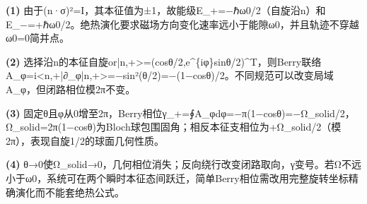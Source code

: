 \par\noindent\textbf{(1)} 由于(n·σ)²=I，其本征值为±1，故能级E\_+=−ℏω0/2（自旋沿n）和E\_−=+ℏω0/2。绝热演化要求磁场方向变化速率远小于能隙ω0，并且轨迹不穿越ω0=0简并点。
\par\noindent\textbf{(2)} 选择沿n的本征自旋or|n,+>=(cosθ/2,e\textasciicircum{}\{iφ\}sinθ/2)\textasciicircum{}T，则Berry联络A\_φ=i<n,+|∂\_φ|n,+>=−sin²(θ/2)=−(1−cosθ)/2。不同规范可以改变局域A\_φ，但闭路相位模2π不变。
\par\noindent\textbf{(3)} 固定θ且φ从0增至2π，Berry相位γ\_+=∮A\_φdφ=−π(1−cosθ)=−Ω\_solid/2，Ω\_solid=2π(1−cosθ)为Bloch球包围固角；相反本征支相位为+Ω\_solid/2（模2π），表现自旋1/2的球面几何性质。
\par\noindent\textbf{(4)} θ→0使Ω\_solid→0，几何相位消失；反向绕行改变闭路取向，γ变号。若Ω不远小于ω0，系统可在两个瞬时本征态间跃迁，简单Berry相位需改用完整旋转坐标精确演化而不能套绝热公式。
